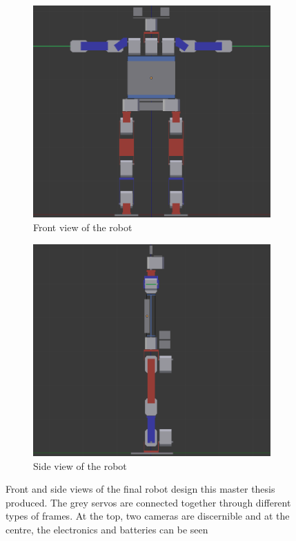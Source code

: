 \begin{figure}[htp]
\center
\begin{subfigure}[b]{0.45\textwidth}
    \includegraphics[width = \textwidth]{figures/robot_v7_front}
    \caption[]{Front view of the robot}
    \label{fig:abstract_robot1}
\end{subfigure}
\hfill
\begin{subfigure}[b]{0.45\textwidth}
\center
    \includegraphics[width = \textwidth]{figures/robot_v7_side}
    \caption[]{Side view of the robot}
    \label{fig:abstract_robot2}
\end{subfigure}
\caption[]{Front and side views of the final robot design this master thesis produced. The grey servos are connected together through different types of frames. At the top, two cameras are discernible and at the centre, the electronics and batteries can be seen}
\label{fig:abstract2}
\end{figure}
\clearpage


